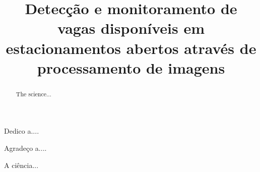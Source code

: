 \documentclass[bacharelado]{unb-cic}
\title{Detecção e monitoramento de vagas disponíveis em estacionamentos abertos através de processamento de imagens}
\begin{document}
  \maketitle
  \pretextual

  \begin{dedicatoria}
  Dedico a....
  \end{dedicatoria}

  \begin{agradecimentos}
  Agradeço a....
  \end{agradecimentos}

  \begin{resumo}
  A ciência...
  \end{resumo}

  \begin{abstract}
  The science...
  \end{abstract}

  \tableofcontents
  \listoffigures
  \listoftables

  \textual
  
	
	
  

  \postextual
  
  
\end{document}
